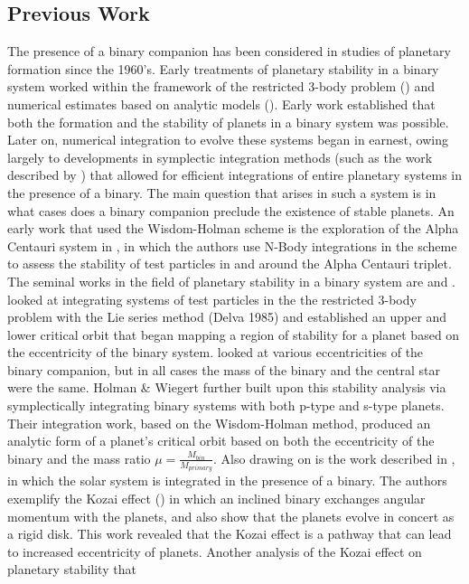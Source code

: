 \documentclass[manuscript]{aastex631}
\begin{document}
\subsection{Previous Work}
The presence of a binary companion has been considered in studies of planetary formation since the 1960's. Early treatments of planetary stability in a binary system worked
within the framework of the restricted 3-body problem (\cite{hua60}) and numerical estimates based on analytic models (\cite{hep78}). Early work established that 
both the formation and the stability of planets in a binary system was possible.\\
Later on, numerical integration to evolve these systems began in earnest, owing largely to developments in symplectic integration methods (such as the work described 
by \cite{wis91}) that 
allowed for efficient integrations of entire planetary systems in the presence of a binary. The main question that arises in such a system is in what cases does a binary 
companion preclude the existence of stable planets. An early work that used the Wisdom-Holman scheme is the exploration of the Alpha Centauri system in \cite{wie97},
in which the authors use N-Body integrations in the \cite{wis91} scheme to assess the stability of test particles in and around the Alpha Centauri triplet. \\
The seminal works in the field of planetary stability in a binary system are \cite{dvo86} and \cite{hol99}. \cite{dvo86} looked at integrating systems of test
particles in the
the restricted 3-body problem with the Lie series method (Delva 1985) and established an upper and lower critical orbit that began mapping a region of stability 
for a planet based on the eccentricity of the binary system. \cite{dvo86} looked at various eccentricities of the binary companion, but in all cases the mass of the binary and 
the central star were the same. 
 Holman \& Wiegert further built upon this stability analysis via symplectically integrating binary systems 
with both p-type and s-type planets. Their integration work, based on the Wisdom-Holman method,
 produced an analytic form of a planet's critical orbit based on both the eccentricity of the binary and the mass
ratio $\mu = \frac{M_{bin}}{M_{primary}}$. Also drawing on \cite{wis91} is the work described in \cite{ina97}, in which the solar system is integrated in the presence of a 
binary. The authors exemplify the Kozai effect (\cite{koz62}) in which an inclined binary exchanges angular momentum with the planets, and also show that the planets evolve in concert 
as a rigid disk. This work revealed that the Kozai effect is a pathway that can lead to increased eccentricity of planets. Another analysis of the Kozai effect on planetary stability that 
\end{document}
